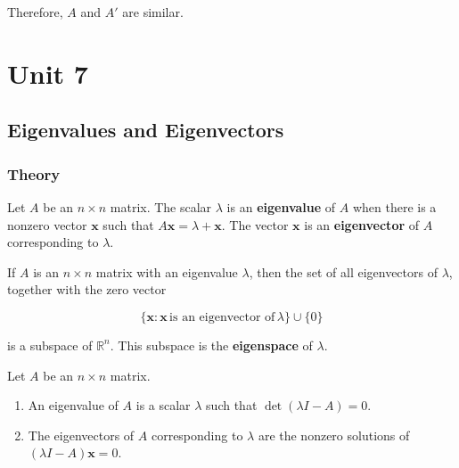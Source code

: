 \documentclass{report}
\begin{document}
\noindent Therefore, $A$ and $A'$ are similar.

\chapter{Unit 7}

\section{Eigenvalues and Eigenvectors}

\subsection{Theory}

\begin{tcolorbox}[title = Definitions of Eigenvalue and Eigenvector]
	Let $A$ be an $n \times n$ matrix. The scalar $\lambda$ is an \textbf{eigenvalue} of $A$ when there is a nonzero vector $\bm{x}$ such that $A\bm{x} = \lambda+ \bm{x}$. The vector $\bm{x}$ is an \textbf{eigenvector} of $A$ corresponding to $\lambda$.
\end{tcolorbox}

\begin{tcolorbox}[title = Eigenvectors of $\lambda$ Form a Subspace]
	If $A$ is an $n \times n$ matrix with an eigenvalue $\lambda$, then the set of all eigenvectors of $\lambda$, together with the zero vector
	
	$$
	\{\bm{x}: \bm{x}  \, \text{is an eigenvector of} \,  \lambda\} \cup \{0\}
	$$
	
	is a subspace of $\mathbb{R}^n$. This subspace is the \textbf{eigenspace} of $\lambda$.
\end{tcolorbox}

\begin{tcolorbox}[title = Eigenvalues and Eigenvectors of a Matrix]
	Let $A$ be an $n \times n$ matrix.
	
	\begin{enumerate}
		\item An eigenvalue of $A$ is a scalar $\lambda$ such that $\det{(\lambda I - A)} = 0$.
		\item The eigenvectors of $A$ corresponding to $\lambda$ are the nonzero solutions of $(\lambda I - A) \bm{x} = 0$.
	\end{enumerate}
\end{tcolorbox}
\end{document}
